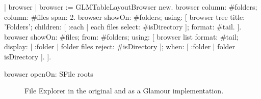 \documentclass[a4paper,10pt,twoside]{book}
\begin{document}
\begin{code}{}
| browser |
browser := GLMTableLayoutBrowser new.
browser
   column: #folders;
   column: #files span: 2.
browser showOn: #folders; using: [
   browser tree
     title: 'Folders';
     children: [ :each | each files select: #isDirectory ];
     format: #tail.
].
browser showOn: #files; from: #folders; using: [
   browser list
     format: #tail;
     display: [ :folder | folder files reject: #isDirectory ];
     when: [ :folder | folder isDirectory ].
].

browser openOn: SFile roots
\end{code}


\begin{figure}[tbp]
\begin{center}
\caption{File Explorer in the original and as a Glamour implementation.}
\label{fig:casestudies/file_explorer}
\end{center}
\end{figure}
\end{document}
